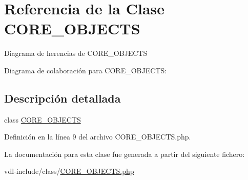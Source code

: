 \hypertarget{classCORE__OBJECTS}{\section{Referencia de la Clase C\-O\-R\-E\-\_\-\-O\-B\-J\-E\-C\-T\-S}
\label{classCORE__OBJECTS}
}


Diagrama de herencias de C\-O\-R\-E\-\_\-\-O\-B\-J\-E\-C\-T\-S


Diagrama de colaboración para C\-O\-R\-E\-\_\-\-O\-B\-J\-E\-C\-T\-S\-:


\subsection{Descripción detallada}
class \hyperlink{classCORE__OBJECTS}{C\-O\-R\-E\-\_\-\-O\-B\-J\-E\-C\-T\-S} 

Definición en la línea 9 del archivo C\-O\-R\-E\-\_\-\-O\-B\-J\-E\-C\-T\-S.\-php.



La documentación para esta clase fue generada a partir del siguiente fichero\-:\begin{DoxyCompactItemize}
\item 
vdl-\/include/class/\hyperlink{CORE__OBJECTS_8php}{C\-O\-R\-E\-\_\-\-O\-B\-J\-E\-C\-T\-S.\-php}\end{DoxyCompactItemize}
